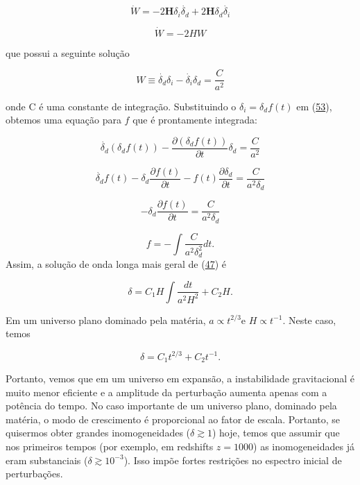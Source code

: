 \documentclass[a4paper,12pt]{article}
\begin{document}
$$\dot{W}=  -2\mathbf{H}\delta_i\dot{\delta_d} +2\mathbf{H}\delta_d \dot{\delta_i} $$

\begin{equation}\label{eq52}
	\dot{W} = -2H W
\end{equation}

que possui a seguinte solução

\begin{equation}\label{eq53}
	W \equiv \dot{\delta_d} \delta_i - \dot{\delta_i} \delta_d = \dfrac{C}{a^2}
\end{equation}

onde C é uma constante de integração. Substituindo o $\delta_i = \delta_d f (t)$ em (\hyperref[eq53]{53}), obtemos uma equação para $f$ que é prontamente integrada:

$$\dot{\delta_d} (\delta_d f(t)) - \dfrac{\partial(\delta_d f(t))}{\partial t} \delta_d = \dfrac{C}{a^2}$$

$$\dot{\delta_d}f(t) - \delta_d\dfrac{\partial f(t)}{\partial t} -f(t)\dfrac{\partial\delta_d }{\partial t}= \dfrac{C}{a^2\delta_d}$$

$$- \delta_d\dfrac{\partial f(t)}{\partial t} = \dfrac{C}{a^2\delta_d}$$

\begin{equation}\label{eq54}
	f = - \int \dfrac{C}{a^2\delta_d^2}dt.
\end{equation}
Assim, a solução de onda longa mais geral de (\hyperref[eq47]{47}) é

\begin{equation}\label{eq55}
	\delta = C_1 H \int \dfrac{dt}{a^2H^2} + C_2 H.
\end{equation}

Em um universo plano dominado pela matéria, $a \propto t^{2/3}$e $H \propto t^{-1}$. Neste caso, temos

\begin{equation}\label{eq56}
	\delta = C_1 t^{2/3} + C_2 t^{-1}.
\end{equation}

Portanto, vemos que em um universo em expansão, a instabilidade gravitacional é muito menor
eficiente e a amplitude da perturbação aumenta apenas com a potência do tempo. No caso importante de um universo plano, dominado pela matéria, o modo de crescimento é proporcional
ao fator de escala. Portanto, se quisermos obter grandes inomogeneidades ($\delta \gtrsim 1$) hoje, temos que assumir que nos primeiros tempos (por exemplo, em redshifts $z = 1000$)
as inomogeneidades já eram substanciais ($\delta \gtrsim 10^{-3}$). Isso impõe fortes
restrições no espectro inicial de perturbações.
\newline
\end{document}
